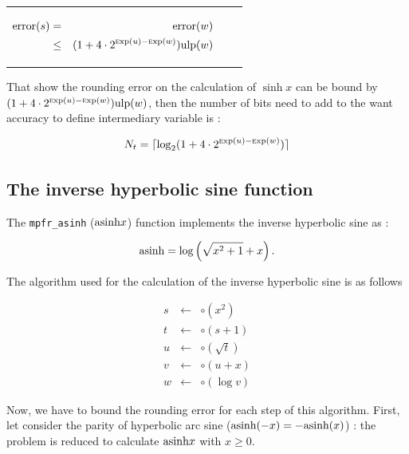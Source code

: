 \documentclass[12pt]{amsart}
\def\n{\textnormal}
\def\ulp{{\rm ulp}}
\def\Exp{{\rm \textsc exp}}
\begin{document}
\begin{center}
\begin{tabular}{l l l}
\begin{minipage}{7.5cm}
\begin{center}
\begin{eqnarray}\nonumber
 {\textnormal{error}}(s) & = &  {\textnormal{error}}(w)\\\nonumber
 & \leq &  (1+ 4 \cdot 2^{\Exp(u)-\Exp(w)}) \ulp(w)
\end{eqnarray}



\end{center}

\end{minipage} &
\begin{minipage}{6cm}


\end{minipage}


\end{tabular}
\end{center}


That show the rounding error on the calculation of $\sinh x$ can be bound by $(1+ 4 \cdot 2^{\Exp(u)-\Exp(w)}) \ulp(w)$, then the number of bits need to add to the want accuracy to define intermediary variable is :

\[
N_t=\lceil \log_2(1+ 4 \cdot 2^{\Exp(u)-\Exp(w)}) \rceil
\]


\subsection{The inverse hyperbolic sine function}

The {\tt mpfr\_asinh} ($\n{asinh}{x}$) function implements the inverse hyperbolic sine as :

\[\n{asinh} = \log \left( \sqrt{x^2+1} + x \right).\]

The algorithm used for the calculation of the inverse hyperbolic sine is as follows

\begin{eqnarray}\nonumber
s&\leftarrow&\circ(x^2)\\\nonumber
t&\leftarrow&\circ(s+1)\\\nonumber
u&\leftarrow&\circ(\sqrt{t})\\\nonumber
v&\leftarrow&\circ(u+x)\\\nonumber
w&\leftarrow&\circ(\log  v)
\end{eqnarray}


Now, we have to bound the rounding error for each step of this
algorithm.  First, let consider the parity of hyperbolic arc sine
($\n{asinh}(-x)=-\n{asinh}(x)$) : the problem is reduced to calculate $\n{asinh} x$
with $x \geq 0$.
\end{document}
